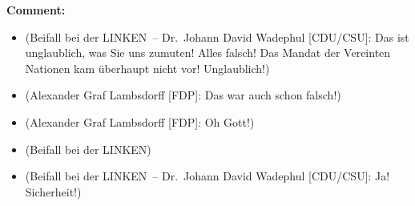 \documentclass{article}
\begin{document}
\noindent\textbf{Comment:}
\begin{itemize}
    \setlength\itemsep{-3pt}
    \item (Beifall bei der LINKEN – Dr. Johann David Wadephul [CDU/CSU]: Das ist unglaublich, was Sie uns zumuten! Alles falsch! Das Mandat der Vereinten Nationen kam überhaupt nicht vor! Unglaublich!)
    \setlength\itemsep{-3pt}
    \item (Alexander Graf Lambsdorff [FDP]: Das war auch schon falsch!)
    \setlength\itemsep{-3pt}
    \item (Alexander Graf Lambsdorff [FDP]: Oh Gott!)
    \setlength\itemsep{-3pt}
    \item (Beifall bei der LINKEN)
    \setlength\itemsep{-3pt}
    \item (Beifall bei der LINKEN – Dr. Johann David Wadephul [CDU/CSU]: Ja! Sicherheit!)
\end{itemize}
\end{document}
